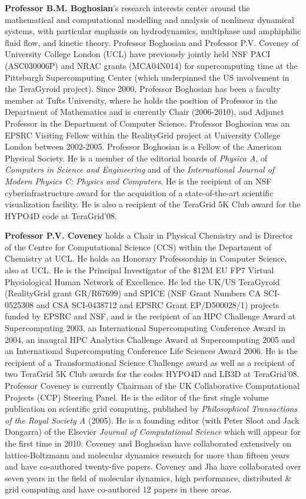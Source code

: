 
\textbf{Professor B.M. Boghosian}'s research interests center around the mathematical and computational modelling and analysis of nonlinear dynamical systems, with particular emphasis on hydrodynamics, multiphase and amphiphilic fluid flow, and kinetic theory. Professor Boghosian and Professor P.V. Coveney of University College London (UCL) have previously jointly held NSF PACI (ASC030006P) and NRAC grants (MCA04N014) for supercomputing time at the Pittsburgh Supercomputing Center (which underpinned the US involvement in the TeraGyroid project). Since 2000,  Professor Boghosian has been a faculty member at Tufts University, where he holds the position of Professor in the Department of Mathematics and is currently Chair (2006-2010), and Adjunct Professor in the Department of Computer Science.  Professor Boghosian was an EPSRC Visiting Fellow within the RealityGrid project at University College London between 2002-2005. Professor Boghosian is a Fellow of the American Physical Society. He is a member of the editorial boards of \emph{Physica A}, of \emph{Computers in Science and 
Engineering} and of the \emph{International Journal of Modern Physics C: Physics and Computers}. He is the recipient of an NSF cyberinfrastructure award for the acquisition of a state-of-the-art scientific visualization facility.
He is also a recipient of the TeraGrid 5K Club award for the HYPO4D code at TeraGrid'08.

\textbf{Professor P.V. Coveney} holds a Chair in Physical Chemistry and is Director of the Centre for Computational Science (CCS) within the Department of Chemistry at UCL. He holds an Honorary Professorship in Computer Science, also at UCL. He is the Principal Investigator of the \$12M EU FP7 Virtual Physiological Human Network of Excellence. He led the UK/US TeraGyroid (RealityGrid grant GR/R67699) and SPICE (NSF Grant Numbers CA SCI-0525308 and CSA SCI-0438712 and EPSRC Grant EP/D500028/1) projects funded by EPSRC and NSF, and is the recipient of an HPC Challenge Award at Supercomputing 2003, an International Supercomputing Conference Award in 2004, an inaugral HPC Analytics Challenge Award at Supercomputing 2005 and an International Supercomputing Conference Life Sciences Award 2006. He is the recipient of a Transformational Science Challenge award as well as a recipient of two TeraGrid 5K Club awards for the codes HYPO4D and LB3D at TeraGrid'08. Professor Coveney is currently Chairman of the UK Collaborative Computational Projects (CCP) Steering Panel. He is the editor of the first single volume publication on scientific grid computing, published by \emph{Philosophical Transactions of the Royal Society A} (2005). He is a founding editor (with Peter Sloot and Jack Dongarra) of the Elsevier \emph{Journal of Computational Science} which will appear for the first time in 2010. Coveney and Boghosian have collaborated extensively on lattice-Boltzmann and molecular dynamics research for more than fifteen years and have co-authored twenty-five papers. Coveney and Jha have collaborated over seven years in the field of molecular dynamics, high performance, distributed \& grid computing and have co-authored 12 papers in these areas.

